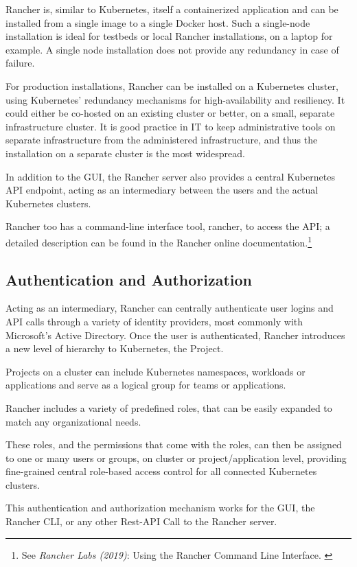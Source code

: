 Rancher is, similar to Kubernetes, itself a containerized application and can be installed from a single image to a single Docker host. Such a single-node installation is ideal for testbeds or local Rancher installations, on a laptop for example. A single node installation does not provide any redundancy in case of failure.

For production installations, Rancher can be installed on a Kubernetes cluster, using Kubernetes' redundancy mechanisms for high-availability and resiliency. It could either be co-hosted on an existing cluster or better, on a small, separate infrastructure cluster. It is good practice in IT to keep administrative tools on separate infrastructure from the administered infrastructure, and thus the installation on a separate cluster is the most widespread.

In addition to the GUI, the Rancher server also provides a central Kubernetes API endpoint, acting as an intermediary between the users and the actual Kubernetes clusters.

Rancher too has a command-line interface tool, rancher, to access the API; a detailed description can be found in the Rancher online documentation.\footnote{See \textit{Rancher Labs (2019)}: Using the Rancher Command Line Interface. \cite{rancherCLI}}

\subsection{Authentication and Authorization}

Acting as an intermediary, Rancher can centrally authenticate user logins and API calls through a variety of identity providers, most commonly with Microsoft's Active Directory. Once the user is authenticated, Rancher introduces a new level of hierarchy to Kubernetes, the Project.

Projects on a cluster can include Kubernetes namespaces, workloads or applications and serve as a logical group for teams or applications. 

Rancher includes a variety of predefined roles, that can be easily expanded to match any organizational needs.

These roles, and the permissions that come with the roles, can then be assigned to one or many users or groups, on cluster or project/application level, providing fine-grained central role-based access control for all connected Kubernetes clusters.

This authentication and authorization mechanism works for the GUI, the Rancher CLI, or any other Rest-API Call to the Rancher server.

